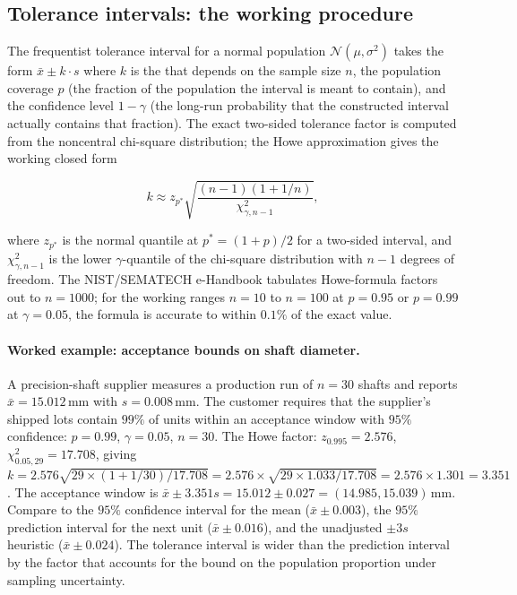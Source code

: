 \subsection{Tolerance intervals: the working procedure}

The frequentist tolerance interval for a normal population
$\mathcal{N}(\mu, \sigma^{2})$ takes the form $\bar{x} \pm k \cdot
s$ where $k$ is the  that depends on
the sample size $n$, the population coverage $p$ (the fraction
of the population the interval is meant to contain), and the
confidence level $1 - \gamma$ (the long-run probability that
the constructed interval actually contains that fraction).
The exact two-sided tolerance factor is computed from the
noncentral chi-square distribution; the Howe approximation
\cite{paper:ch08t3p-howe-1969} gives the working closed form

\[
k \approx z_{p^{*}} \sqrt{\frac{(n - 1)(1 + 1/n)}{\chi^{2}_{\gamma, n-1}}},
\]

where $z_{p^{*}}$ is the normal quantile at $p^{*} = (1 + p)/2$
for a two-sided interval, and $\chi^{2}_{\gamma, n-1}$ is the
lower $\gamma$-quantile of the chi-square distribution with
$n - 1$ degrees of freedom. The NIST/SEMATECH e-Handbook
\cite{web:ch08t3p-nist-eshandbook-7263} tabulates Howe-formula
factors out to $n = 1000$; for the working ranges $n = 10$ to
$n = 100$ at $p = 0.95$ or $p = 0.99$ at $\gamma = 0.05$, the
formula is accurate to within $0.1\%$ of the exact value.

\paragraph{Worked example: acceptance bounds on shaft diameter.}
A precision-shaft supplier measures a production run of
$n = 30$ shafts and reports $\bar{x} = 15.012\,\si{\milli\meter}$
with $s = 0.008\,\si{\milli\meter}$. The customer requires that
the supplier's shipped lots contain $99\%$ of units within an
acceptance window with $95\%$ confidence: $p = 0.99$, $\gamma
= 0.05$, $n = 30$. The Howe factor: $z_{0.995} = 2.576$,
$\chi^{2}_{0.05, 29} = 17.708$, giving
$k = 2.576\sqrt{29 \times (1 + 1/30)/17.708} = 2.576 \times
\sqrt{29 \times 1.033/17.708} = 2.576 \times 1.301 = 3.351$.
The acceptance window is $\bar{x} \pm 3.351 s = 15.012 \pm
0.027 = (14.985, 15.039)\,\si{\milli\meter}$. Compare to the
$95\%$ confidence interval for the mean ($\bar{x} \pm 0.003$),
the $95\%$ prediction interval for the next unit ($\bar{x} \pm
0.016$), and the unadjusted $\pm 3s$ heuristic ($\bar{x} \pm
0.024$). The tolerance interval is wider than the prediction
interval by the factor that accounts for the bound on the
population proportion under sampling uncertainty.

